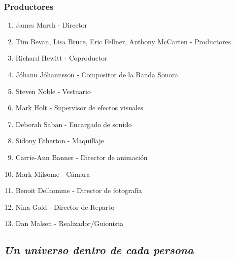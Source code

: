 \documentclass[a5paper, 11pt]{article}
\begin{document}
{        \subsubsection{Productores}
        
        \begin{enumerate}[1.]
    
                \item James Marsh - Director
                \item Tim Bevan, Lisa Bruce, Eric Fellner, Anthony McCarten - Productores
                \item Richard Hewitt - Coproductor
                \item Jóhann Jóhannsson - Compositor de la Banda Sonora
                \item Steven Noble - Vestuario
                \item Mark Holt - Supervisor de efectos visuales
                \item Deborah Saban - Encargado de sonido
                \item Sidony Etherton - Maquillaje
                \item Carrie-Ann Banner - Director de animación
                \item Mark Milsome - Cámara
                \item Benoit Delhomme - Director de fotografía
                \item Nina Gold - Director de Reparto
                \item Dan Malsen - Realizador/Guionista
    
            \end{enumerate}
    
    }
    
    
    
    
    \subsection{\emph{\normalsize{Un universo dentro de cada persona}}}
    
\end{document}
